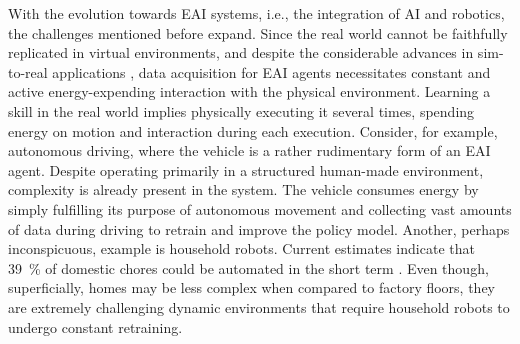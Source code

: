 \documentclass[12pt]{article}
\begin{document}
With the evolution towards EAI systems, i.e., the integration of AI and robotics, the challenges mentioned before expand. Since the real world cannot be faithfully replicated in virtual environments, and despite the considerable advances in sim-to-real applications \cite{Chebotar2019Closingsimreal}, data acquisition for EAI agents necessitates constant and active energy-expending interaction with the physical environment. Learning a skill in the real world implies physically executing it several times, spending energy on motion and interaction during each execution. Consider, for example, autonomous driving, where the vehicle is a rather rudimentary form of an EAI agent. Despite operating primarily in a structured human-made environment, complexity is already present in the system. The vehicle consumes energy by simply fulfilling its purpose of autonomous movement and collecting vast amounts of data during driving to retrain and improve the policy model. Another, perhaps inconspicuous, example is household robots. Current estimates indicate that 39~\%  of domestic chores could be automated in the short term \cite{Lehdonvirta2022futuresunpaidwork}. Even though, superficially, homes may be less complex when compared to factory floors, they are extremely challenging dynamic environments that require household robots to undergo constant retraining. 
\end{document}
